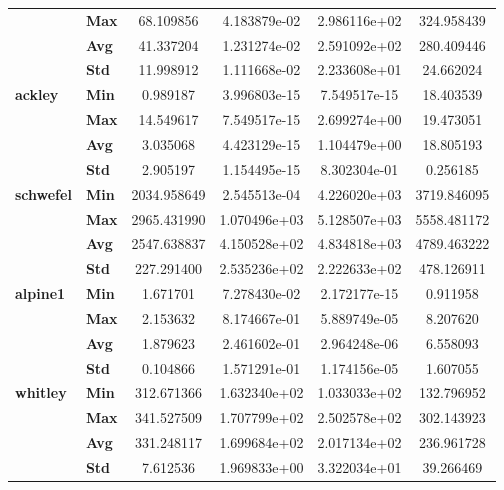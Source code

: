\begin{longtable}{llcccc}
            & \textbf{Max} &    68.109856 &  4.183879e-02 &  2.986116e+02 &   324.958439 \\
            & \textbf{Avg} &    41.337204 &  1.231274e-02 &  2.591092e+02 &   280.409446 \\
            & \textbf{Std} &    11.998912 &  1.111668e-02 &  2.233608e+01 &    24.662024 \\
\cline{1-6}
\multirow{4}{*}{\textbf{ackley}} & \textbf{Min} &     0.989187 &  3.996803e-15 &  7.549517e-15 &    18.403539 \\
            & \textbf{Max} &    14.549617 &  7.549517e-15 &  2.699274e+00 &    19.473051 \\
            & \textbf{Avg} &     3.035068 &  4.423129e-15 &  1.104479e+00 &    18.805193 \\
            & \textbf{Std} &     2.905197 &  1.154495e-15 &  8.302304e-01 &     0.256185 \\
\cline{1-6}
\multirow{4}{*}{\textbf{schwefel}} & \textbf{Min} &  2034.958649 &  2.545513e-04 &  4.226020e+03 &  3719.846095 \\
            & \textbf{Max} &  2965.431990 &  1.070496e+03 &  5.128507e+03 &  5558.481172 \\
            & \textbf{Avg} &  2547.638837 &  4.150528e+02 &  4.834818e+03 &  4789.463222 \\
            & \textbf{Std} &   227.291400 &  2.535236e+02 &  2.222633e+02 &   478.126911 \\
\cline{1-6}
\multirow{4}{*}{\textbf{alpine1}} & \textbf{Min} &     1.671701 &  7.278430e-02 &  2.172177e-15 &     0.911958 \\
            & \textbf{Max} &     2.153632 &  8.174667e-01 &  5.889749e-05 &     8.207620 \\
            & \textbf{Avg} &     1.879623 &  2.461602e-01 &  2.964248e-06 &     6.558093 \\
            & \textbf{Std} &     0.104866 &  1.571291e-01 &  1.174156e-05 &     1.607055 \\
\cline{1-6}
\multirow{4}{*}{\textbf{whitley}} & \textbf{Min} &   312.671366 &  1.632340e+02 &  1.033033e+02 &   132.796952 \\
            & \textbf{Max} &   341.527509 &  1.707799e+02 &  2.502578e+02 &   302.143923 \\
            & \textbf{Avg} &   331.248117 &  1.699684e+02 &  2.017134e+02 &   236.961728 \\
            & \textbf{Std} &     7.612536 &  1.969833e+00 &  3.322034e+01 &    39.266469 \\

\end{longtable}
